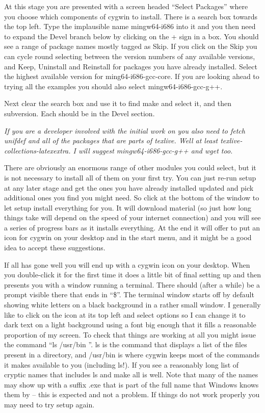 At this stage you are presented with a screen headed ``Select Packages'' where
you choose which components of cygwin to install. There is a search box towards
the top left. Type the implausible name {\tx mingw64-i686} into it and you
then need to expand the {\tx Devel} branch below by clicking on the
{\tx +} sign in a box. You should see a range of package names mostly
tagged as {\tx Skip}. If you click on the {\tx Skip} you can cycle round
selecting between the version numbers of any available versions, and
{\tx Keep}, {\tx Uninstall} and {\tx Reinstall} for packages you have already
installed. Select the highest available version for {\tx ming64-i686-gcc-core}.
If you are looking ahead to trying all the \vsl{} examples you should also
select {\tx mingw64-i686-gcc-g++}.

Next clear the search box and use it to find {\tx make} and select it, and then
{\tx subversion}. Each should be in the {\tx Devel} section.
\begin{marginpar}
{\em If you are a developer involved with the initial work on \vsl{}
you also need to fetch {\tx unifdef} and all of the packages
that are parts of {\tx texlive}. Well at least
{\tx texlive-collections-latexextra}. I will suggest
{\tx mingw64-i686-gcc-g++} and {\tx wget} too.}
\end{marginpar}
There are
obviously an enormous range of other modules you could select, but it is not
necessary to install all of them on your first try. You can just re-run
{\tx setup} at any later stage and get the ones you have already installed
updated and pick additional ones you find you might need. So click at the
bottom of the window to let {\tx setup} install everything for you. It will
download material (so just how long things take will depend on the speed
of your internet connection) and you will see a series of progress bars
as it installs everything. At the end it will offer to put an icon for
cygwin on your desktop and in the start menu, and it might be a good idea
to accept these suggestions.

If all has gone well you will end up with a cygwin icon on your desktop.
When you double-click it for the first time it does a little bit of
final setting up and then presents you with a window running a terminal.
There should (after a while) be a prompt visible there that ends in
``{\tx \$}''. The terminal window starts off by default showing white letters
on a black background in a rather small window. I generally like to
click on the icon at its top left and select {\tx options} so I
can change it to dark text on a light background using a font big enough that
it fills a reasonable proportion of my screen. To check that things are
working at all you might issue the command ``{\tx ls /usr/bin} ''. {\tx ls}
is the command that displays a list of the files present in a directory, and
{\tx /usr/bin} is where {\tx cygwin} keeps most of the commands it
makes available to you (including {\tx ls}!). If you see a reasonably long
list of cryptic names that includes {\tx ls} and {\tx make} all is well.
Note that many of the names may show up with a suffix {\tx .exe} that is part
of the full name that Windows knows them by -- this is expected and not
a problem.
If things do not work properly you may need to try {\tx setup} again.

